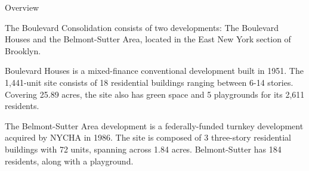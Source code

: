 Overview 

The Boulevard Consolidation consists of two developments: The Boulevard Houses and the Belmont-Sutter Area, located in the East New York section of Brooklyn. 

Boulevard Houses is a mixed-finance conventional development built in 1951. The 1,441-unit site consists of 18 residential buildings ranging between 6-14 stories. Covering 25.89 acres, the site also has green space and 5 playgrounds for its 2,611 residents. 

The Belmont-Sutter Area development is a federally-funded turnkey development acquired by NYCHA in 1986. The site is composed of 3 three-story residential buildings with 72 units, spanning across 1.84 acres. Belmont-Sutter has 184 residents, along with a playground. 